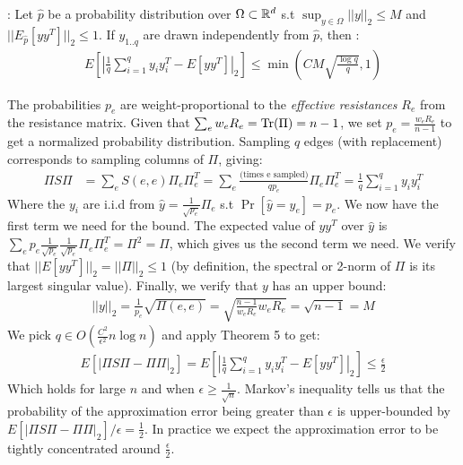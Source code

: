 \documentclass{article}
\begin{document}
\noindent
{}: Let $\hat{p}$ be a probability
distribution over $\Omega \subset \mathbb{R}^d$ s.t $\sup_{y \in \Omega} ||y||_2
\leq M$ and $||E_{\hat{p}}[yy^T]||_2 \leq 1$. If $y_{1..q}$ are drawn
independently from $\hat{p}$, then \cite{TheSurvey}
\cite{SpielmanSrivastava} \cite{RudelsonVershynin}:
\begin{align*}
    E\left[\left| \frac{1}{q} \sum^q_{i=1} y_iy^T_i - E[yy^T] \right|_2
    \right] \leq \min\left(CM\sqrt{\frac{\log q}{q}}, 1\right)
\end{align*}

The probabilities $p_e$ are weight-proportional to the \textit{effective
resistances} $R_e$ from the resistance matrix. Given that $\sum_e w_eR_e =
\text{Tr}(\Pi) = n - 1$, we set $p_e = \frac{w_eR_e}{n - 1}$ to get a normalized
probability distribution. Sampling $q$ edges (with replacement) corresponds
to sampling columns of $\Pi$, giving:
\begin{align*}
    \Pi S\Pi &= \sum_e S(e, e)\Pi_e\Pi^T_e
             = \sum_e \frac{\text{(times e sampled)}}{qp_e}\Pi_e\Pi^T_e
             = \frac{1}{q}\sum_{i=1}^q y_iy^T_i
\end{align*}
Where the $y_i$ are i.i.d from $\hat{y} = \frac{1}{\sqrt{p_e}}\Pi_e$ s.t
$\Pr[\hat{y} = y_e] = p_e$. We now have the first term we need for the
bound. The expected value of $yy^T$ over $\hat{y}$ is $\sum_e
p_e\frac{1}{\sqrt{p_e}}\frac{1}{\sqrt{p_e}}\Pi_e\Pi^T_e = \Pi^2 = \Pi$,
which gives us the second term we need. We verify that $||E[yy^T]||_2 =
||\Pi||_2 \leq 1$ (by definition, the spectral or 2-norm of $\Pi$ is its
largest singular value). Finally, we verify that $y$ has an upper bound:
\begin{align*}
    ||y||_2 = \frac{1}{p_e}\sqrt{\Pi(e, e)} = \sqrt{\frac{n -
    1}{w_eR_e}w_eR_e} = \sqrt{n-1} = M
\end{align*}
We pick $q \in O(\frac{C^2}{\epsilon^2}n\log n)$ and apply Theorem 5 to get:
\begin{align*}
    E[|\Pi S \Pi - \Pi\Pi|_2] =
    E\left[\left| \frac{1}{q} \sum^q_{i=1} y_iy^T_i - E[yy^T] \right|_2
    \right] \leq \frac{\epsilon}{2}
\end{align*}
Which holds for large $n$ and when $\epsilon \geq \frac{1}{\sqrt{n}}$.
Markov's inequality tells us that the probability of the approximation error
being greater than $\epsilon$ is upper-bounded by $E[|\Pi S \Pi -
\Pi\Pi|_2]/\epsilon = \frac{1}{2}$. In practice we expect the approximation
error to be tightly concentrated around $\frac{\epsilon}{2}$.
\end{document}
